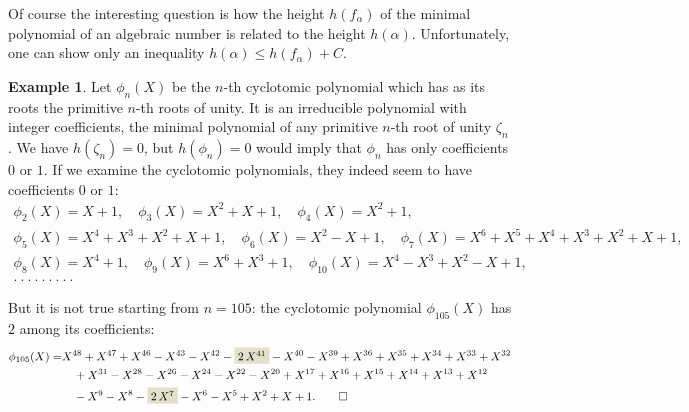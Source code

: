 \documentclass{article}
\theoremstyle{definition}
\newtheorem{example}[proposition]{Example}
\begin{document}
Of course the interesting question is how the height $h (f_\alpha)$ of the
minimal polynomial of an algebraic number is related to the height $h
(\alpha)$. Unfortunately, one can show only an inequality
$h (\alpha) \le h (f_\alpha) + C$.

\begin{example}
  Let $\phi_n (X)$ be the $n$-th cyclotomic polynomial which has as its roots
  the primitive $n$-th roots of unity. It is an irreducible polynomial with
  integer coefficients, the minimal polynomial of any primitive $n$-th root of
  unity $\zeta_n$. We have $h (\zeta_n) = 0$, but $h (\phi_n) = 0$ would imply
  that $\phi_n$ has only coefficients $0$ or $1$. If we examine the cyclotomic
  polynomials, they indeed seem to have coefficients $0$ or $1$:
  \begin{gather*}
    \phi_2 (X) = X+1, \quad \phi_3 (X) = X^2 + X + 1, \quad \phi_4 (X) = X^2 + 1,\\
    \phi_5 (X) = X^4 + X^3 + X^2 + X + 1, \quad \phi_6 (X) = X^2 - X + 1, \quad \phi_7 (X) = X^6 + X^5 + X^4 + X^3 + X^2 + X + 1,\\
    \phi_8 (X) = X^4 + 1, \quad \phi_9 (X) = X^6 + X^3 + 1, \quad \phi_{10} (X) = X^4 - X^3 + X^2 - X + 1,\\
    . ~ . ~ . ~ . ~ . ~ . ~ . ~ . ~ .
  \end{gather*}

  But it is not true starting from $n = 105$: the cyclotomic polynomial
  $\phi_{105} (X)$ has $2$ among its coefficients:
  \begin{align*}
    \phi_{105} (X) = & X^{48} + X^{47} + X^{46} - X^{43} - X^{42} - \colorbox{shadecolor}{$2\,X^{41}$} - X^{40} - X^{39} + X^{36} + X^{35} + X^{34} + X^{33} + X^{32}\\
                     & \quad + X^{31} - X^{28} - X^{26} - X^{24} - X^{22} - X^{20} + X^{17} + X^{16} + X^{15} + X^{14} + X^{13} + X^{12}\\
                     & \quad - X^9 - X^8 - \colorbox{shadecolor}{$2\,X^7$} - X^6 - X^5 + X^2 + X + 1. \qedhere
  \end{align*}
\end{example}
\end{document}
